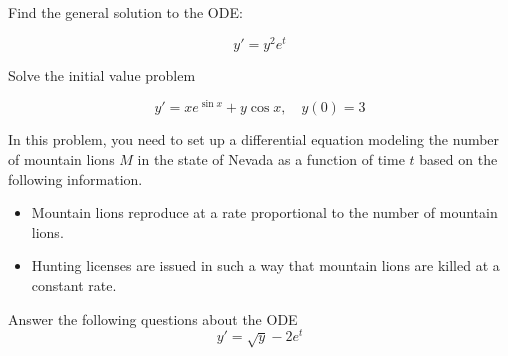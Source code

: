 \documentclass[addpoints,12pt]{exam}
\begin{document}
\newpage
\begin{questions}

\question[10] Find the general solution to the ODE:

$$y'=y^2e^t$$
\newpage

\question[10] Solve the initial value problem

$$y'=xe^{\sin x}+y\cos x,\quad y(0)=3$$

\newpage

\question[6] In this problem, you need to set up a differential equation modeling the number of mountain lions $M$ in the state of Nevada as a function of time $t$ based on the following information.
 \begin{itemize}
  \item Mountain lions reproduce at a rate proportional to the number of mountain lions.
  \item Hunting licenses are issued in such a way that mountain lions are killed at a constant rate.
 \end{itemize}
 
 
 \newpage

\question[8] Answer the following questions about the ODE
$$y'=\sqrt y - 2e^{t}$$

\end{questions}
\end{document}

